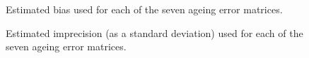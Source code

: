 \documentclass[
]{scrartcl}
\begin{document}
\begin{figure}[H]


\caption{\label{fig-AE_bias}Estimated bias used for each of the seven
ageing error matrices.}

\end{figure}%

\begin{figure}[H]


\caption{\label{fig-AE_SD}Estimated imprecision (as a standard
deviation) used for each of the seven ageing error matrices.}

\end{figure}%
\end{document}
